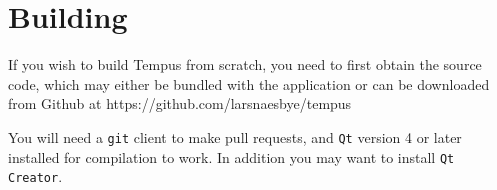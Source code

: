 \section{Building}

If you wish to build Tempus from scratch, you need to first obtain the source code, which may either be bundled with the application or can be downloaded from Github at https://github.com/larsnaesbye/tempus

You will need a \texttt{git} client to make pull requests, and \texttt{Qt} version 4 or later installed for compilation to work. In addition you may want to install \texttt{Qt Creator}.
